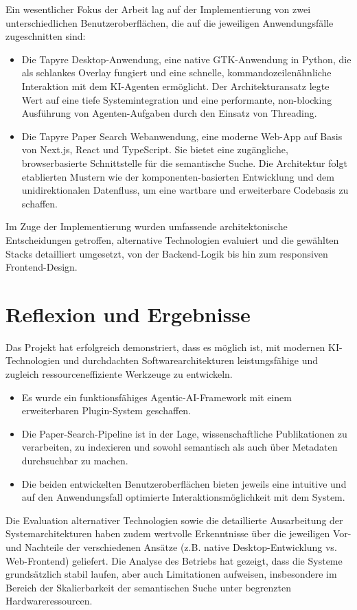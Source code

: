 Ein wesentlicher Fokus der Arbeit lag auf der Implementierung von zwei unterschiedlichen Benutzeroberflächen, die auf die jeweiligen Anwendungsfälle zugeschnitten sind:
\begin{itemize}
	\item Die Tapyre Desktop-Anwendung, eine native GTK-Anwendung in Python, die als schlankes Overlay fungiert und eine schnelle, kommandozeilenähnliche Interaktion mit dem KI-Agenten ermöglicht. Der Architekturansatz legte Wert auf eine tiefe Systemintegration und eine performante, non-blocking Ausführung von Agenten-Aufgaben durch den Einsatz von Threading.
	\item Die Tapyre Paper Search Webanwendung, eine moderne Web-App auf Basis von Next.js, React und TypeScript. Sie bietet eine zugängliche, browserbasierte Schnittstelle für die semantische Suche. Die Architektur folgt etablierten Mustern wie der komponenten-basierten Entwicklung und dem unidirektionalen Datenfluss, um eine wartbare und erweiterbare Codebasis zu schaffen.
\end{itemize}
Im Zuge der Implementierung wurden umfassende architektonische Entscheidungen getroffen, alternative Technologien evaluiert und die gewählten Stacks detailliert umgesetzt, von der Backend-Logik bis hin zum responsiven Frontend-Design.

\section{Reflexion und Ergebnisse}
Das Projekt hat erfolgreich demonstriert, dass es möglich ist, mit modernen KI-Technologien und durchdachten Softwarearchitekturen leistungsfähige und zugleich ressourceneffiziente Werkzeuge zu entwickeln.
\begin{itemize}
	\item Es wurde ein funktionsfähiges Agentic-AI-Framework mit einem erweiterbaren Plugin-System geschaffen.
	\item Die Paper-Search-Pipeline ist in der Lage, wissenschaftliche Publikationen zu verarbeiten, zu indexieren und sowohl semantisch als auch über Metadaten durchsuchbar zu machen.
	\item Die beiden entwickelten Benutzeroberflächen bieten jeweils eine intuitive und auf den Anwendungsfall optimierte Interaktionsmöglichkeit mit dem System.
\end{itemize}
Die Evaluation alternativer Technologien sowie die detaillierte Ausarbeitung der Systemarchitekturen haben zudem wertvolle Erkenntnisse über die jeweiligen Vor- und Nachteile der verschiedenen Ansätze (z.B. native Desktop-Entwicklung vs. Web-Frontend) geliefert. Die Analyse des Betriebs hat gezeigt, dass die Systeme grundsätzlich stabil laufen, aber auch Limitationen aufweisen, insbesondere im Bereich der Skalierbarkeit der semantischen Suche unter begrenzten Hardwareressourcen.

